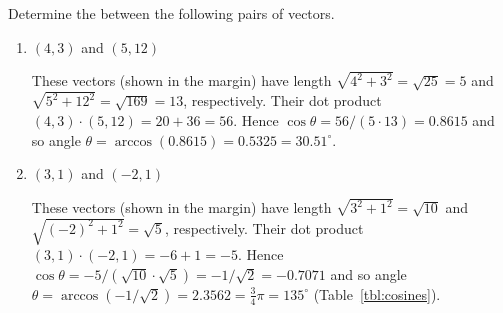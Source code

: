 \begin{example} \label{eg:}
Determine the  between the following pairs of vectors.
\begin{enumerate}
\item \((4,3)\) and \((5,12)\)
\begin{solution} 
These vectors (shown in the margin) have length \(\sqrt{4^2+3^2}=\sqrt{25}=5\) and \(\sqrt{5^2+12^2}=\sqrt{169}=13\), respectively.
Their dot product  \((4,3)\cdot(5,12)=20+36=56\).
Hence \(\cos\theta =56/(5\cdot13) =0.8615\) and so angle \(\theta =\arccos(0.8615) =0.5325 =30.51^\circ\).
%
\end{solution}


\item \((3,1)\) and \((-2,1)\)
\begin{solution} 
These vectors (shown in the margin) have length \(\sqrt{3^2+1^2}=\sqrt{10}\) and \(\sqrt{(-2)^2+1^2}=\sqrt{5}\), respectively.
Their dot product  \((3,1)\cdot(-2,1)=-6+1=-5\).
Hence \(\cos\theta =-5/(\sqrt{10}\cdot\sqrt5) =-1/\sqrt2 =-0.7071\) and so angle \(\theta =\arccos(-1/\sqrt2) =2.3562 =\frac34\pi =135^\circ\) (Table~\ref{tbl:cosines}).
%
\end{solution}




\end{enumerate}
\end{example}
